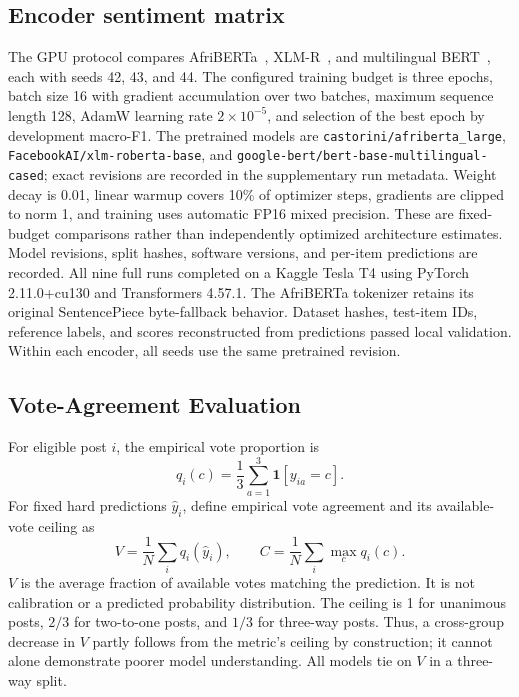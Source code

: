 \documentclass[conference]{IEEEtran}
\begin{document}
\subsection{Encoder sentiment matrix}
The GPU protocol compares AfriBERTa~\cite{afriberta-model},
XLM-R~\cite{xlmr-model}, and multilingual BERT~\cite{bert-model}, each
with seeds 42, 43, and 44. The configured training budget is three epochs,
batch size 16 with gradient accumulation over two batches, maximum sequence
length 128, AdamW learning rate $2\times10^{-5}$, and selection of the
best epoch by development macro-F1.
The pretrained models are \texttt{castorini/afriberta\_large},
\texttt{FacebookAI/xlm-roberta-base}, and
\texttt{google-bert/bert-base-multilingual-cased}; exact revisions are
recorded in the supplementary run metadata. Weight decay is 0.01, linear
warmup covers 10\% of optimizer steps, gradients are clipped to norm 1,
and training uses automatic FP16 mixed precision. These are fixed-budget
comparisons rather than independently optimized architecture estimates.
Model revisions, split hashes, software versions, and per-item predictions
are recorded. All nine full runs completed on a Kaggle Tesla T4 using
PyTorch 2.11.0+cu130 and Transformers 4.57.1. The AfriBERTa tokenizer retains
its original SentencePiece byte-fallback behavior. Dataset hashes, test-item
IDs, reference labels, and scores reconstructed from predictions passed local
validation. Within each encoder, all seeds use the same pretrained revision.

\subsection{Vote-Agreement Evaluation}
For eligible post $i$, the empirical vote proportion is
\begin{equation}
q_i(c)=\frac{1}{3}\sum_{a=1}^{3}\mathbf{1}[y_{ia}=c].
\end{equation}
For fixed hard predictions $\widehat y_i$, define empirical vote agreement
and its available-vote ceiling as
\begin{equation}
V=\frac{1}{N}\sum_i q_i(\widehat y_i),\qquad
C=\frac{1}{N}\sum_i\max_c q_i(c).
\end{equation}
$V$ is the average fraction of available votes matching the prediction.
It is not calibration or a predicted probability distribution.
The ceiling is 1 for unanimous posts, $2/3$ for two-to-one posts, and $1/3$
for three-way posts. Thus, a cross-group decrease in $V$ partly follows from
the metric's ceiling by construction; it cannot alone demonstrate poorer
model understanding. All models tie on $V$ in a three-way split.
\end{document}
